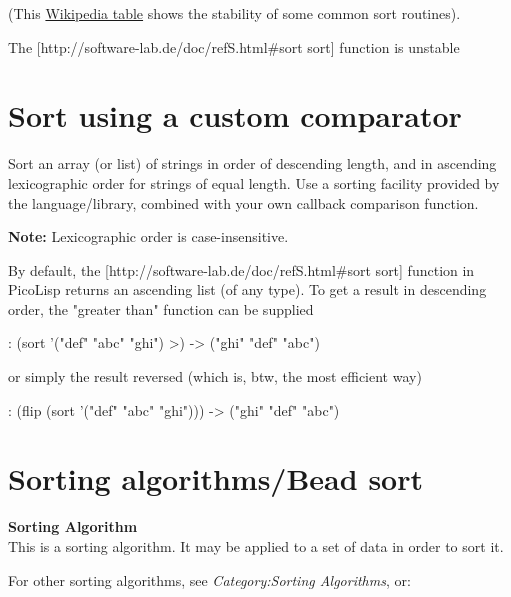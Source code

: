 (This
\href{http://en.wikipedia.org/wiki/Stable\_sort\#Comparison\_of\_algorithms}{Wikipedia
table} shows the stability of some common sort routines).


\begin{wideverbatim}

The [http://software-lab.de/doc/refS.html#sort sort] function is unstable

\end{wideverbatim}

\pagebreak{}
\section*{Sort using a custom comparator}

Sort an array (or list) of strings in order of descending length, and in
ascending lexicographic order for strings of equal length. Use a sorting
facility provided by the language/library, combined with your own
callback comparison function.

\textbf{Note:} Lexicographic order is case-insensitive.

\begin{wideverbatim}

By default, the [http://software-lab.de/doc/refS.html#sort sort] function in
PicoLisp returns an ascending list (of any type). To get a result in descending
order, the "greater than" function can be supplied

: (sort '("def" "abc" "ghi") >)
-> ("ghi" "def" "abc")

or simply the result reversed (which is, btw, the most efficient way)

: (flip (sort '("def" "abc" "ghi")))
-> ("ghi" "def" "abc")

\end{wideverbatim}

\pagebreak{}
\section*{Sorting algorithms/Bead sort}

\textbf{Sorting Algorithm}\\ This is a sorting algorithm. It may be
applied to a set of data in order to sort it.

For other sorting algorithms, see
\emph{Category:Sorting Algorithms},
or:

